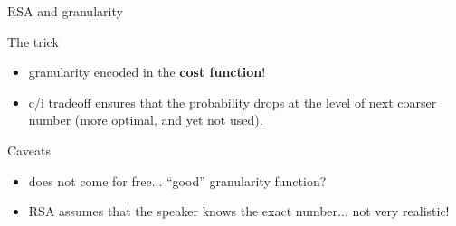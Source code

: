 \documentclass[xcolor=table, hyperref={pdfpagelabels=false}]{beamer}
\begin{document}
\begin{frame}{RSA and granularity}
\begin{minipage}{.55\textwidth}
	 \begin{block}{The trick}
 	\begin{itemize}
 		\item granularity encoded in the \textbf{cost function}! \pause
 		\item c/i tradeoff ensures that the probability drops at the level of next coarser number (more optimal, and yet not used).
 	\end{itemize}
 \end{block}
\pause
\begin{alertblock}{Caveats}
	\begin{itemize}
		\item does not come for free... ``good'' granularity function? \pause
		\item RSA assumes that the speaker knows the exact number... not very realistic!
	\end{itemize}
\end{alertblock}
\end{minipage}

\end{frame}
\end{document}
